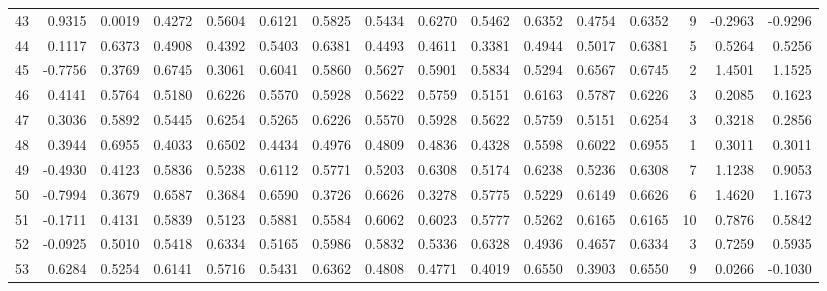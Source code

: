 \begin{tabular}{lrrrrrrrrrrrrrrr}
43  &      0.9315 &  0.0019 &  0.4272 &  0.5604 &  0.6121 &  0.5825 &  0.5434 &  0.6270 &  0.5462 &  0.6352 &   0.4754 &     0.6352 &      9 &                   -0.2963 &                    -0.9296 \\
44  &      0.1117 &  0.6373 &  0.4908 &  0.4392 &  0.5403 &  0.6381 &  0.4493 &  0.4611 &  0.3381 &  0.4944 &   0.5017 &     0.6381 &      5 &                    0.5264 &                     0.5256 \\
45  &     -0.7756 &  0.3769 &  0.6745 &  0.3061 &  0.6041 &  0.5860 &  0.5627 &  0.5901 &  0.5834 &  0.5294 &   0.6567 &     0.6745 &      2 &                    1.4501 &                     1.1525 \\
46  &      0.4141 &  0.5764 &  0.5180 &  0.6226 &  0.5570 &  0.5928 &  0.5622 &  0.5759 &  0.5151 &  0.6163 &   0.5787 &     0.6226 &      3 &                    0.2085 &                     0.1623 \\
47  &      0.3036 &  0.5892 &  0.5445 &  0.6254 &  0.5265 &  0.6226 &  0.5570 &  0.5928 &  0.5622 &  0.5759 &   0.5151 &     0.6254 &      3 &                    0.3218 &                     0.2856 \\
48  &      0.3944 &  0.6955 &  0.4033 &  0.6502 &  0.4434 &  0.4976 &  0.4809 &  0.4836 &  0.4328 &  0.5598 &   0.6022 &     0.6955 &      1 &                    0.3011 &                     0.3011 \\
49  &     -0.4930 &  0.4123 &  0.5836 &  0.5238 &  0.6112 &  0.5771 &  0.5203 &  0.6308 &  0.5174 &  0.6238 &   0.5236 &     0.6308 &      7 &                    1.1238 &                     0.9053 \\
50  &     -0.7994 &  0.3679 &  0.6587 &  0.3684 &  0.6590 &  0.3726 &  0.6626 &  0.3278 &  0.5775 &  0.5229 &   0.6149 &     0.6626 &      6 &                    1.4620 &                     1.1673 \\
51  &     -0.1711 &  0.4131 &  0.5839 &  0.5123 &  0.5881 &  0.5584 &  0.6062 &  0.6023 &  0.5777 &  0.5262 &   0.6165 &     0.6165 &     10 &                    0.7876 &                     0.5842 \\
52  &     -0.0925 &  0.5010 &  0.5418 &  0.6334 &  0.5165 &  0.5986 &  0.5832 &  0.5336 &  0.6328 &  0.4936 &   0.4657 &     0.6334 &      3 &                    0.7259 &                     0.5935 \\
53  &      0.6284 &  0.5254 &  0.6141 &  0.5716 &  0.5431 &  0.6362 &  0.4808 &  0.4771 &  0.4019 &  0.6550 &   0.3903 &     0.6550 &      9 &                    0.0266 &                    -0.1030 \\

\end{tabular}

